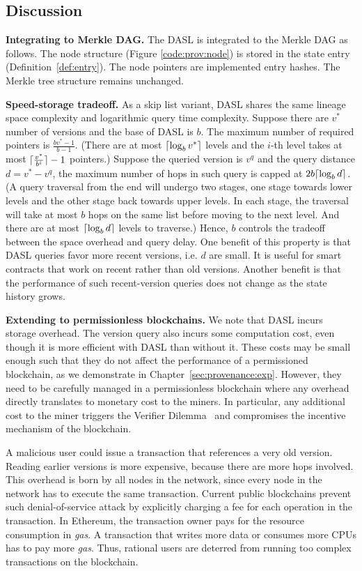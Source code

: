 \subsection{Discussion} \label{sec:provenance:model_discuss}
\textbf{Integrating to Merkle DAG. } 
The DASL is integrated to the Merkle DAG as follows. The node structure (Figure \ref{code:prov:node}) is stored in
the state entry (Definition~\ref{def:entry}).  The node pointers are implemented entry hashes. The Merkle tree
structure remains unchanged.  

\textbf{Speed-storage tradeoff. } 
As a skip list variant, DASL shares the same lineage space complexity and 
logarithmic query time complexity. 
Suppose there are $v^*$ number of versions and the base of DASL is $b$. 
The maximum number of required pointers is $\frac{bv^*-1}{b-1}$. 
(There are at most $\lceil\log_b v^*\rceil$ levels and the $i$-th level takes at most $\lceil\frac{v^*}{b^i}\rceil-1$ pointers.)
Suppose the queried version is $v^q$ and the query distance $d=v^*-v^q$, the maximum number of hops in such query is capped at $2b\lceil\log_b d\rceil$. (A query traversal from the end will undergo two stages, one stage towards lower levels  and the other stage back towards upper levels. In each stage, 
the traversal will take at most $b$ hops on the same list before moving to the next level.
And there are at most $\lceil\log_b d\rceil$ levels to traverse.)
Hence, $b$ controls the tradeoff between the space overhead and query delay. 
One benefit of this property is that DASL queries favor more recent
versions, i.e. $d$ are small.
It is useful for smart contracts that work on recent rather than old versions.  
Another benefit is that the performance of such recent-version queries does not change as the state history grows.  

\textbf{Extending to permissionless blockchains. } 
We note that DASL incurs storage overhead. The version query also incurs some computation cost, even though it
is more efficient with DASL than without it. These costs may be small enough such that they do not
affect the performance of a permissioned blockchain, as we demonstrate in Chapter~\ref{sec:provenance:exp}.  However,
they need to be carefully managed in a permissionless blockchain where any overhead directly translates to
monetary cost to the miners. In particular, any additional cost to the miner triggers the Verifier
Dilemma~\cite{luu2015demystifying} and compromises the incentive mechanism of the blockchain.  

A malicious user could issue a transaction that references a very old version. Reading earlier versions is more
expensive, because there are more hops involved. This overhead is born by all nodes in the network,
since every node in the network has to execute the same transaction. Current public blockchains prevent such
denial-of-service attack by explicitly charging a fee for each operation in the transaction. In Ethereum, the
transaction owner pays for the resource consumption in {\em gas}. A transaction that writes more data or
consumes more CPUs has to pay more {\em gas}. Thus, rational users are deterred from running too complex
transactions on the blockchain. 

